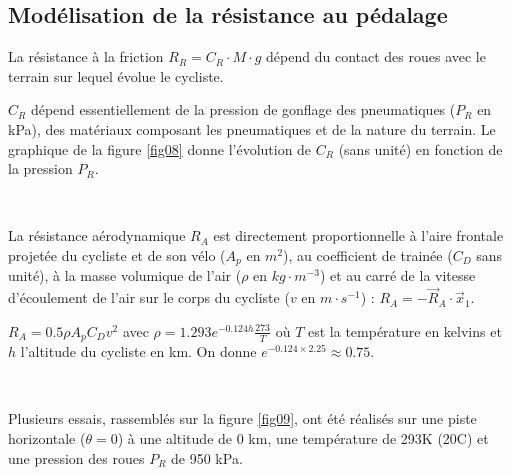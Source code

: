 \newpage

\subsection{Modélisation de la résistance au pédalage}

La résistance à la friction $R_R=C_R\cdot M\cdot g$ dépend du contact des roues avec le terrain sur lequel évolue le cycliste.

$C_R$ dépend essentiellement de la pression de gonflage des pneumatiques ($P_R$ en kPa), des matériaux composant les pneumatiques et de la nature du terrain. Le graphique de la figure \ref{fig08} donne l'évolution de $C_R$ (sans unité)
en fonction de la pression $P_R$.



~\

La résistance aérodynamique $R_A$ est directement proportionnelle à l'aire frontale projetée du cycliste et de son vélo ($A_p$ en $m^2$), au coefficient de trainée ($C_D$ sans unité), à la masse volumique de l'air ($\rho$ en $kg\cdot m^{-3}$) et au carré de la vitesse d'écoulement de l'air sur le corps du cycliste ($v$ en $m\cdot s^{-1}$) : $R_A=-\vec{R}_A\cdot \vec{x}_1$.

$R_A=0.5\rho A_p C_D v^2$ avec $\rho=1.293e^{-0.124h}\frac{273}{T}$ où $T$ est la température en kelvins et $h$ l'altitude du cycliste en km. On donne $e^{-0.124\times 2.25}\approx 0.75$.



~\

Plusieurs essais, rassemblés sur la figure \ref{fig09}, ont été réalisés sur une piste horizontale ($\theta=0$) à une altitude de 0 km, une température de 293K (20\degree C) et une pression des roues $P_R$ de 950 kPa.


\vspace{-0.5cm}

